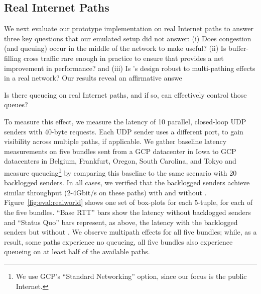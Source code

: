 %

\subsection{Real Internet Paths}\label{s:eval:realworld}




We next evaluate our prototype implementation on real Internet paths to answer three key questions that our emulated setup did not answer: (i) Does congestion (and queuing) occur in the middle of the network to make \name useful? (ii) Is buffer-filling cross traffic rare enough in practice to ensure that \name provides a net improvement in performance? and (iii) Is \name's design robust to multi-pathing effects in a real network?  
Our results reveal an affirmative answe

Is there queueing on real Internet paths, and if so, can \name effectively control those queues?

To measure this effect, we measure the latency of 10 parallel, closed-loop UDP senders with 40-byte requests. Each UDP sender uses a different port, to gain visibility across multiple paths, if applicable.
We gather baseline latency measurements on five bundles sent from a GCP datacenter in Iowa to GCP datacenters in Belgium, Frankfurt, Oregon, South Carolina, and Tokyo and measure queueing\footnote{We use GCP's ``Standard Networking'' option, since our focus is the public Internet.}
by comparing this baseline to the same scenario with 20 backlogged senders.
In all cases, we verified that the backlogged senders achieve similar throughput (2-4Gbit/s on these paths) with and without \name.
Figure~\ref{fig:eval:realworld} shows one set of box-plots for each 5-tuple, for each of the five bundles. ``Base RTT'' bars show the latency without backlogged senders and ``Status Quo'' bars represent, as above, the latency with the backlogged senders but without \name.
We observe multipath effects for all five bundles; while, as a result, some paths experience no queueing, all five bundles also experience queueing on at least half of the available paths.

